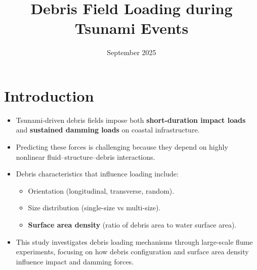 \documentclass{article}
\title{Debris Field Loading during Tsunami Events}
\date{September 2025}
\begin{document}
\maketitle

\section{Introduction}
\begin{itemize}
    \item Tsunami-driven debris fields impose both \textbf{short-duration impact loads} and \textbf{sustained damming loads} on coastal infrastructure.
    \item Predicting these forces is challenging because they depend on highly nonlinear fluid–structure–debris interactions.
    \item Debris characteristics that influence loading include:
    \begin{itemize}
        \item Orientation (longitudinal, transverse, random).
        \item Size distribution (single-size vs multi-size).
        \item \textbf{Surface area density} (ratio of debris area to water surface area).
    \end{itemize}
    \item This study investigates debris loading mechanisms through large-scale flume experiments, focusing on how debris configuration and surface area density influence impact and damming forces.
\end{itemize}
\end{document}
